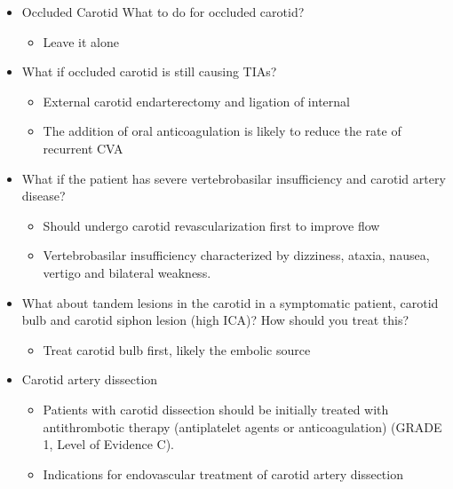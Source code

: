 \documentclass[
]{book}
\providecommand{\tightlist}{%
  \setlength{\itemsep}{0pt}\setlength{\parskip}{0pt}}
\begin{document}
\begin{itemize}
\item
  Occluded Carotid What to do for occluded carotid?

  \begin{itemize}
  \tightlist
  \item
    Leave it alone
  \end{itemize}
\item
  What if occluded carotid is still causing TIAs?

  \begin{itemize}
  \item
    External carotid endarterectomy and ligation of internal
  \item
    The addition of oral anticoagulation is likely to reduce the
    rate of recurrent CVA
  \end{itemize}
\item
  What if the patient has severe vertebrobasilar insufficiency and
  carotid artery disease?

  \begin{itemize}
  \tightlist
  \item
    Should undergo carotid revascularization first to improve flow
  \item
    Vertebrobasilar insufficiency characterized by dizziness,
    ataxia, nausea, vertigo and bilateral weakness.
    \citep{limanetoPathophysiologyDiagnosisVertebrobasilar2017}
  \end{itemize}
\item
  What about tandem lesions in the carotid in a symptomatic patient,
  carotid bulb and carotid siphon lesion (high ICA)? How should you
  treat this?

  \begin{itemize}
  \tightlist
  \item
    Treat carotid bulb first, likely the embolic source
  \end{itemize}
\item
  Carotid artery dissection

  \begin{itemize}
  \item
    Patients with carotid dissection should be initially treated
    with antithrombotic therapy (antiplatelet agents or
    anticoagulation) (GRADE 1, Level of Evidence C).
  \item
    Indications for endovascular treatment of carotid artery
    dissection \citep{cohenSinglecenterExperienceEndovascular2012, markusAntiplateletTherapyVs2019a, phamEndovascularStentingExtracranial2011}


\end{itemize}
\end{itemize}
\end{document}
